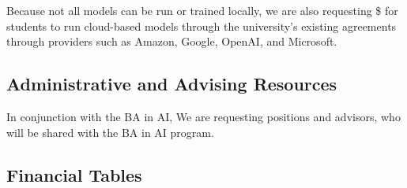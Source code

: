 Because not all models can be run or trained locally, we are also requesting \$\cloud{} for students to run cloud-based models through the university's existing agreements through providers such as Amazon, Google, OpenAI, and Microsoft.

\subsection{Administrative and Advising Resources}

In conjunction with the BA in AI, We are requesting \admin{} positions and \advisors{} advisors, who will be shared with the BA in AI program.  

\subsection{Financial Tables}